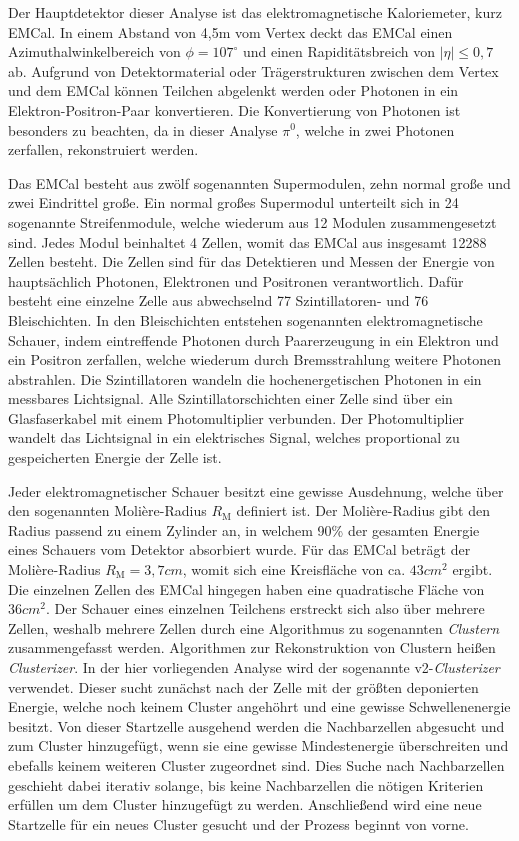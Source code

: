 Der Hauptdetektor dieser Analyse ist das elektromagnetische Kaloriemeter, kurz EMCal.
In einem Abstand von 4,5m vom Vertex deckt das EMCal einen Azimuthalwinkelbereich von $\phi=107^{\circ}$ und einen Rapidit\"atsbreich von $ |\eta| \leq 0,7$ ab.
Aufgrund von Detektormaterial oder Tr\"agerstrukturen zwischen dem Vertex und dem EMCal k\"onnen Teilchen abgelenkt werden oder Photonen in ein Elektron-Positron-Paar konvertieren.
Die Konvertierung von Photonen ist besonders zu beachten, da in dieser Analyse $\pi^{0}$, welche in zwei Photonen zerfallen, rekonstruiert werden.

Das EMCal besteht aus zw\"olf sogenannten Supermodulen, zehn normal gro{\ss}e und zwei Eindrittel gro{\ss}e.
Ein normal gro{\ss}es Supermodul unterteilt sich in 24 sogenannte Streifenmodule, welche wiederum aus 12 Modulen zusammengesetzt sind.
Jedes Modul beinhaltet 4 Zellen, womit das EMCal aus insgesamt 12288 Zellen besteht.
Die Zellen sind f\"ur das Detektieren und Messen der Energie von haupts\"achlich Photonen, Elektronen und Positronen verantwortlich.
Daf\"ur besteht eine einzelne Zelle aus abwechselnd 77 Szintillatoren- und 76 Bleischichten.
In den Bleischichten entstehen sogenannten elektromagnetische Schauer, indem eintreffende Photonen durch Paarerzeugung in ein Elektron und ein Positron zerfallen, welche wiederum durch Bremsstrahlung weitere Photonen abstrahlen.
Die Szintillatoren wandeln die hochenergetischen Photonen in ein messbares Lichtsignal.
Alle Szintillatorschichten einer Zelle sind \"uber ein Glasfaserkabel mit einem Photomultiplier verbunden.
Der Photomultiplier wandelt das Lichtsignal in ein elektrisches Signal, welches proportional zu gespeicherten Energie der Zelle ist.

Jeder elektromagnetischer Schauer besitzt eine gewisse Ausdehnung, welche \"uber den sogenannten Moli\`ere-Radius $R_{\text{M}}$ definiert ist.
Der Moli\`ere-Radius gibt den Radius passend zu einem Zylinder an, in welchem 90\% der gesamten Energie eines Schauers vom Detektor absorbiert wurde.
F\"ur das EMCal betr\"agt der Moli\`ere-Radius $R_{\text{M}} = 3,7 cm$, womit sich eine Kreisfl\"ache von ca. $43 cm^{2}$ ergibt.
Die einzelnen Zellen des EMCal hingegen haben eine quadratische Fl\"ache von $36 cm^{2}$. 
Der Schauer eines einzelnen Teilchens erstreckt sich also \"uber mehrere Zellen, weshalb mehrere Zellen durch eine Algorithmus zu sogenannten \textit{Clustern} zusammengefasst werden.
Algorithmen zur Rekonstruktion von Clustern hei{\ss}en \textit{Clusterizer}.
In der hier vorliegenden Analyse wird der sogenannte v2-\textit{Clusterizer} verwendet.
Dieser sucht zun\"achst nach der Zelle mit der gr\"o{\ss}ten deponierten Energie, welche noch keinem Cluster angeh\"ohrt und eine gewisse Schwellenenergie besitzt.
Von dieser Startzelle ausgehend werden die Nachbarzellen abgesucht und zum Cluster hinzugef\"ugt, wenn sie eine gewisse Mindestenergie \"uberschreiten und ebefalls keinem weiteren Cluster zugeordnet sind.
Dies Suche nach Nachbarzellen geschieht dabei iterativ solange, bis keine Nachbarzellen die n\"otigen Kriterien erf\"ullen um dem Cluster hinzugef\"ugt zu werden.
Anschlie{\ss}end wird eine neue Startzelle f\"ur ein neues Cluster gesucht und der Prozess beginnt von vorne.

